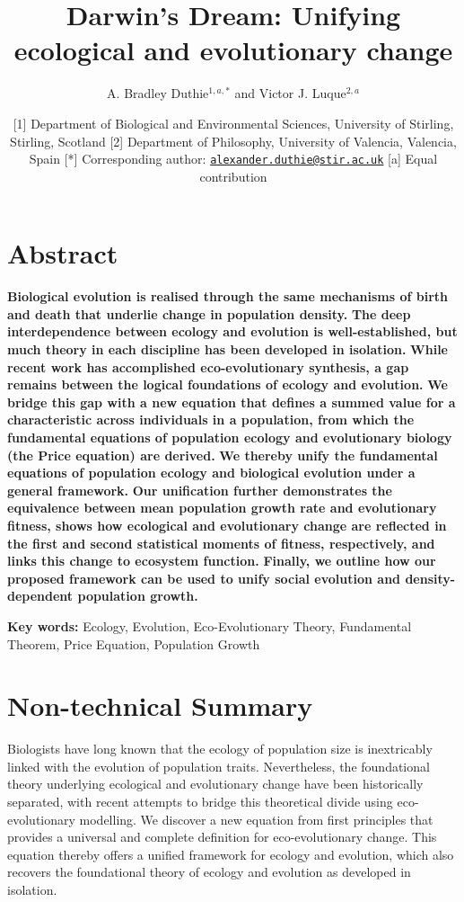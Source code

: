 \documentclass[
]{article}
\title{Darwin's Dream: Unifying ecological and evolutionary change}
\author{A. Bradley Duthie\(^{1,a,*}\) and Victor J. Luque\(^{2,a}\)}
\date{{[}1{]} Department of Biological and Environmental Sciences,
University of Stirling, Stirling, Scotland {[}2{]} Department of
Philosophy, University of Valencia, Valencia, Spain {[}*{]}
Corresponding author:
\href{mailto:alexander.duthie@stir.ac.uk}{\nolinkurl{alexander.duthie@stir.ac.uk}}
{[}a{]} Equal contribution}
\begin{document}
\maketitle

\hypertarget{abstract}{%
\section{Abstract}\label{abstract}}

\textbf{Biological evolution is realised through the same mechanisms of
birth and death that underlie change in population density.} \textbf{The
deep interdependence between ecology and evolution is well-established,
but much theory in each discipline has been developed in isolation.}
\textbf{While recent work has accomplished eco-evolutionary synthesis, a
gap remains between the logical foundations of ecology and evolution.}
\textbf{We bridge this gap with a new equation that defines a summed
value for a characteristic across individuals in a population, from
which the fundamental equations of population ecology and evolutionary
biology (the Price equation) are derived.} \textbf{We thereby unify the
fundamental equations of population ecology and biological evolution
under a general framework.} \textbf{Our unification further demonstrates
the equivalence between mean population growth rate and evolutionary
fitness, shows how ecological and evolutionary change are reflected in
the first and second statistical moments of fitness, respectively, and
links this change to ecosystem function.} \textbf{Finally, we outline
how our proposed framework can be used to unify social evolution and
density-dependent population growth.}

\textbf{Key words:} Ecology, Evolution, Eco-Evolutionary Theory,
Fundamental Theorem, Price Equation, Population Growth

\hypertarget{non-technical-summary}{%
\section{Non-technical Summary}\label{non-technical-summary}}

Biologists have long known that the ecology of population size is
inextricably linked with the evolution of population traits.
Nevertheless, the foundational theory underlying ecological and
evolutionary change have been historically separated, with recent
attempts to bridge this theoretical divide using eco-evolutionary
modelling. We discover a new equation from first principles that
provides a universal and complete definition for eco-evolutionary
change. This equation thereby offers a unified framework for ecology and
evolution, which also recovers the foundational theory of ecology and
evolution as developed in isolation.
\end{document}

